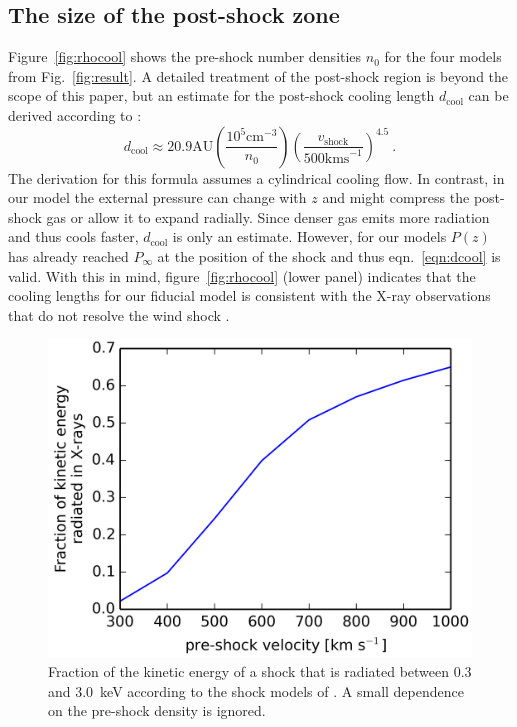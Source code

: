 \documentclass{emulateapj}
\begin{document}
\subsection{The size of the post-shock zone}
Figure~\ref{fig:rhocool} shows the pre-shock number densities $n_0$ for the four models from Fig.~\ref{fig:result}. A detailed treatment of the post-shock region is beyond the scope of this paper, but an estimate for the post-shock cooling length $d_{\mathrm{cool}}$ can be derived according to \citet{2002ApJ...576L.149R}:
\begin{equation} \label{eqn:dcool}
d_{\mathrm{cool}} \approx 20.9 \mathrm{ AU}
    \left(\frac{10^5\mathrm{ cm}^{-3}}{n_0}\right)
    \left(\frac{v_{\mathrm{shock}}}{500\mathrm{ km s}^{-1}}\right)^{4.5}\ .
\end{equation}
The derivation for this formula assumes a cylindrical cooling flow. In contrast, in our model the external pressure can change with $z$ and might compress the post-shock gas or allow it to expand radially. Since denser gas emits more radiation and thus cools faster, $d_{\mathrm{cool}}$ is only an estimate. However, for our models $P(z)$ has already reached $P_\infty$ at the position of the shock and thus eqn.~\ref{eqn:dcool} is valid. With this in mind, figure~\ref{fig:rhocool} (lower panel) indicates that the cooling lengths for our fiducial model is consistent with the X-ray observations that do not resolve the wind shock \citep{2008A&A...488L..13S}.


\begin{figure}[h!]
\begin{center}
\includegraphics[width=0.7\columnwidth]{figures/fracxray/fracxray.png}
\caption{\label{fig:fracxray}
Fraction of the kinetic energy of a shock that is radiated between 0.3 and 3.0~keV according to the shock models of . A small dependence on the pre-shock density is ignored.
}
\end{center}
\end{figure}
\end{document}
